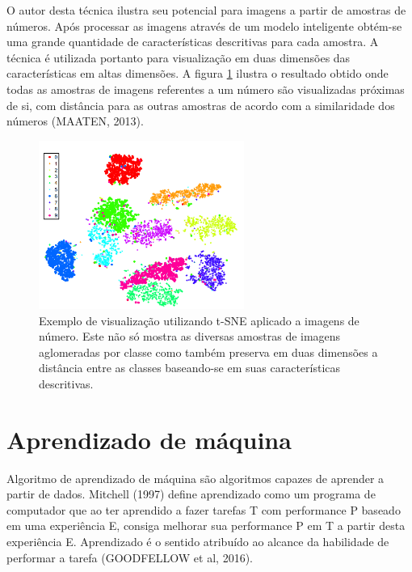 \documentclass[12pt]{report}
\begin{document}
O autor desta técnica ilustra seu potencial para imagens a partir de amostras de números. Após processar as imagens através de um modelo inteligente obtém-se uma grande quantidade de características descritivas para cada amostra. A técnica é utilizada portanto para visualização em duas dimensões das características em altas dimensões. A figura \ref{fig:tsne} ilustra o resultado obtido onde todas as amostras de imagens referentes a um número são visualizadas próximas de si, com distância para as outras amostras de acordo com a similaridade dos números (MAATEN, 2013).  

\begin{figure}
    \centering
    \includegraphics[width=0.6\textwidth]{images/ts.png}
    \caption{Exemplo de visualização utilizando t-SNE aplicado a imagens de número. Este não só mostra as diversas amostras de imagens aglomeradas por classe como também preserva em duas dimensões a distância entre as classes baseando-se em suas características descritivas.}
    \label{fig:tsne}
\end{figure}


\section{Aprendizado de máquina}

Algoritmo de aprendizado de máquina são algoritmos capazes de aprender a partir de dados. Mitchell (1997) define aprendizado como um programa de computador que ao ter aprendido a fazer tarefas T com performance P baseado em uma experiência E, consiga melhorar sua performance P em T a partir desta experiência E. Aprendizado é o sentido atribuído ao alcance da habilidade de performar a tarefa (GOODFELLOW et al, 2016).
\end{document}
